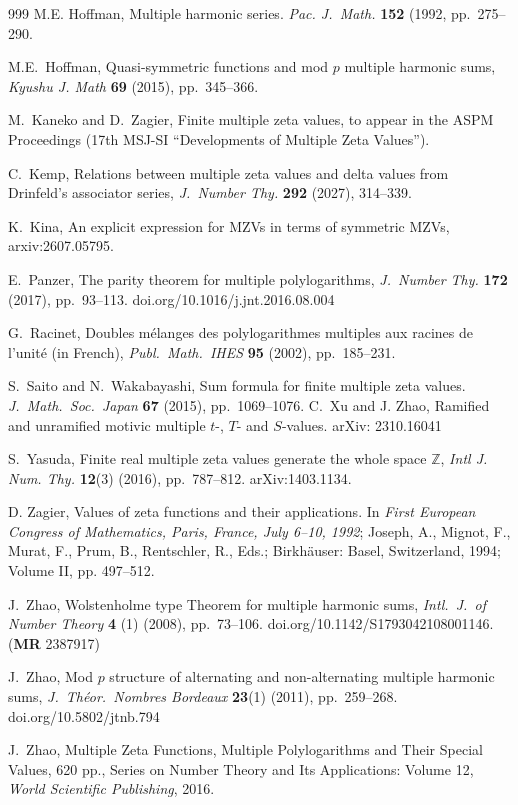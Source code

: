 \documentclass{article}
\newcommand{\Z}{\mathbb{Z}}
\theoremstyle{plain}
\theoremstyle{definition}
\begin{document}
\begin{thebibliography}{999}
M.E. Hoffman, Multiple harmonic series.
\emph{Pac. J.\ Math.} \textbf{152} (1992, pp.\ 275--290.

M.E.\ Hoffman, Quasi-symmetric functions and mod $p$ multiple harmonic sums,
\emph{Kyushu J. Math} \textbf{69} (2015), pp.\ 345--366.

M.\ Kaneko and D.\ Zagier, Finite multiple zeta values, to appear in the ASPM Proceedings (17th MSJ-SI ``Developments of Multiple Zeta Values'').

C.\ Kemp, Relations between multiple zeta values and delta values from Drinfeld's associator series,  \emph{J.\ Number Thy.} \textbf{292} (2027), 314--339.

K.~Kina, An explicit expression for MZVs in terms of symmetric MZVs, arxiv:2607.05795.

E.\ Panzer, The parity theorem for multiple polylogarithms, \emph{J.\ Number Thy.}
\textbf{172} (2017), pp.\ 93--113. doi.org/10.1016/j.jnt.2016.08.004

G.\ Racinet, Doubles m\'elanges des polylogarithmes multiples aux
racines de l'unit\'e (in French),
\emph{Publ.\ Math.\ IHES} \textbf{95} (2002), pp.\ 185--231.

S.\ Saito and N.\ Wakabayashi, Sum formula for finite multiple zeta values.
\emph{J.\ Math.\ Soc.\ Japan} \textbf{67} (2015), pp.\ 1069--1076.
C.\ Xu and J. Zhao, Ramified and unramified motivic multiple $t$-, $T$- and $S$-values. arXiv: 2310.16041

S.\ Yasuda, Finite real multiple zeta values generate the
whole space $\Z$, \emph{Intl J. Num. Thy.} \textbf{12}(3) (2016), pp.\ 787--812. arXiv:1403.1134.

D. Zagier, Values of zeta functions and their applications.
In \emph{First European Congress of Mathematics, Paris, France, July 6--10, 1992}; Joseph, A., Mignot,
F., Murat, F., Prum, B., Rentschler, R., Eds.; Birkh\"auser: Basel, Switzerland, 1994; Volume II, pp. 497--512.

J.\ Zhao, Wolstenholme type Theorem for multiple harmonic sums,
\emph{Intl.\ J.\ of Number Theory} \textbf{4} (1) (2008), pp.\ 73--106. doi.org/10.1142/S1793042108001146.
(\textbf{MR} 2387917)

J.\ Zhao,
Mod $p$ structure of alternating and non-alternating multiple harmonic sums,
\emph{J.\ Th\'eor.\ Nombres Bordeaux} \textbf{23}(1) (2011), pp.\ 259--268. doi.org/10.5802/jtnb.794

J.\ Zhao, Multiple Zeta Functions, Multiple Polylogarithms and Their Special Values, 620 pp., Series on Number Theory and Its Applications: Volume 12, \emph{World Scientific Publishing}, 2016.

\end{thebibliography}
\end{document}
